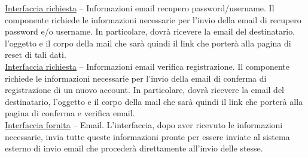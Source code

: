 \documentclass{article}
\begin{document}
      \underline{Interfaccia richiesta} – Informazioni email recupero password/username. Il componente richiede le informazioni necessarie per l’invio della email di recupero
      password e/o username. In particolare, dovrà ricevere la email del destinatario, l’oggetto e il corpo della mail che sarà quindi il link che porterà alla pagina di reset di
      tali dati.\\

      \underline{Interfaccia richiesta} – Informazioni email verifica registrazione. Il componente richiede le informazioni necessarie per l’invio della email di conferma di
      registrazione di un nuovo account. In particolare, dovrà ricevere la email del destinatario, l’oggetto e il corpo della mail che sarà quindi il link che porterà alla pagina di
      conferma e verifica email.\\

      \underline{Interfaccia fornita} – Email. L’interfaccia, dopo aver ricevuto le informazioni necessarie, invia tutte queste informazioni pronte per essere inviate al sistema
      esterno di invio email che procederà direttamente all’invio delle stesse.\\

      \newpage
\end{document}
